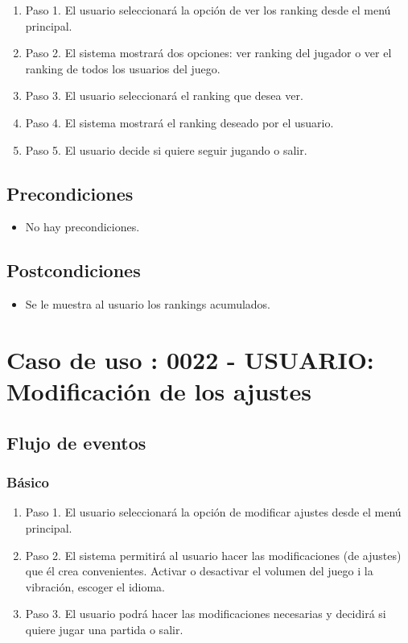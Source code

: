 \begin{enumerate}
\item Paso 1.
El usuario seleccionará la opción de ver los ranking desde el menú principal. 
\item Paso 2.
El sistema mostrará dos opciones: ver ranking del jugador o ver el ranking de todos los usuarios del juego.
\item Paso 3.
El usuario seleccionará el ranking que desea ver.
\item Paso 4.
El sistema mostrará el ranking deseado por el usuario.
\item Paso 5.
El usuario decide si quiere seguir jugando o salir.
\end{enumerate}

\subsection{Precondiciones}
\begin{itemize}
\item No hay precondiciones.
\end{itemize}

\subsection{Postcondiciones}
\begin{itemize}
\item Se le muestra al usuario los rankings acumulados. 
\end{itemize}



\section{Caso de uso : 0022 - USUARIO: Modificación de los ajustes}\label{sec:uc0}
\subsection{Flujo de eventos}
\subsubsection{Básico}

\begin{enumerate}
\item Paso 1.
El usuario seleccionará la opción de modificar ajustes desde el menú principal. 
\item Paso 2.
El sistema permitirá al usuario hacer las modificaciones (de ajustes) que él crea convenientes. Activar o desactivar el volumen del juego i la vibración, escoger el idioma.
\item Paso 3.
El usuario podrá hacer las modificaciones necesarias y decidirá si quiere jugar una partida o salir.
\end{enumerate}

